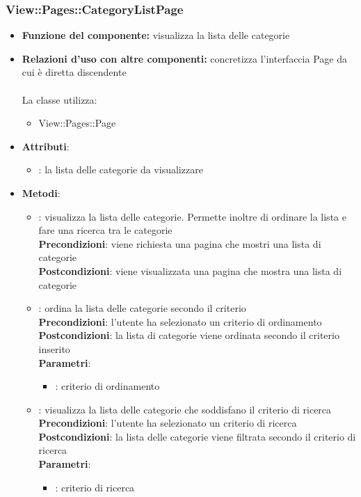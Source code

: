\subsubsection{View::Pages::CategoryListPage}
\begin{itemize}
\item\textbf{Funzione del componente:} visualizza la lista delle categorie
				\item\textbf{Relazioni d'uso con altre componenti:} concretizza l'interfaccia Page da cui è diretta discendente\\ \\
La classe utilizza:
	\begin{itemize}
		\item View::Pages::Page\\
	\end{itemize}
\item\textbf{Attributi}:
	\begin{itemize}
		\item{}: la lista delle categorie da visualizzare\\
	\end{itemize}
\item\textbf{Metodi}:
	\begin{itemize}
		\item{}: visualizza la lista delle categorie. Permette inoltre di ordinare la lista e fare una ricerca tra le categorie\\
			\textbf{Precondizioni}: viene richiesta una pagina che mostri una lista di categorie\\
			\textbf{Postcondizioni}: viene visualizzata una pagina che mostra una lista di categorie\\
		\item{}: ordina la lista delle categorie secondo il criterio \\
			\textbf{Precondizioni}: l'utente ha selezionato un criterio di ordinamento\\
			\textbf{Postcondizioni}: la lista di categorie viene ordinata secondo il criterio inserito\\
			\textbf{Parametri}:
				\begin{itemize}
					\item{}: criterio di ordinamento\\
				\end{itemize}
		\item{}: visualizza la lista delle categorie che soddisfano il criterio di ricerca \\
			\textbf{Precondizioni}: l'utente ha selezionato un criterio di ricerca\\
			\textbf{Postcondizioni}: la lista delle categorie viene filtrata secondo il criterio di ricerca\\
			\textbf{Parametri}:
				\begin{itemize}
					\item{}: criterio di ricerca\\
				\end{itemize}
	\end{itemize}
\end{itemize}